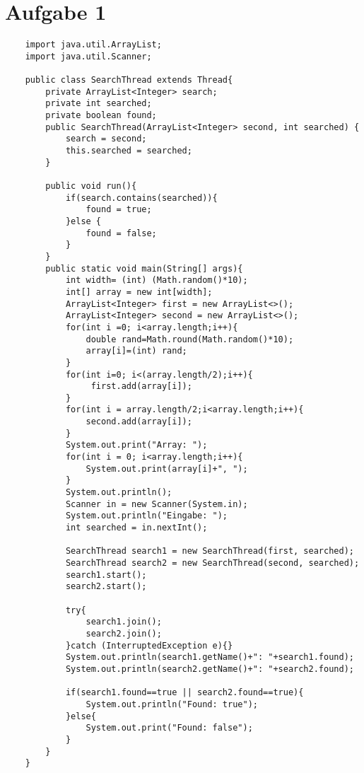 \documentclass[12pt,a4paper,oneside,ngerman]{article}
\begin{document}

\section*{Aufgabe 1}
\begin{lstlisting}
    import java.util.ArrayList;
    import java.util.Scanner;
    
    public class SearchThread extends Thread{
        private ArrayList<Integer> search;
        private int searched;
        private boolean found;
        public SearchThread(ArrayList<Integer> second, int searched) {
            search = second;
            this.searched = searched;
        }
    
        public void run(){
            if(search.contains(searched)){
                found = true;
            }else {
                found = false;
            }
        }
        public static void main(String[] args){
            int width= (int) (Math.random()*10);
            int[] array = new int[width];
            ArrayList<Integer> first = new ArrayList<>();
            ArrayList<Integer> second = new ArrayList<>();
            for(int i =0; i<array.length;i++){
                double rand=Math.round(Math.random()*10);
                array[i]=(int) rand;
            }
            for(int i=0; i<(array.length/2);i++){
                 first.add(array[i]);
            }
            for(int i = array.length/2;i<array.length;i++){
                second.add(array[i]);
            }
            System.out.print("Array: ");
            for(int i = 0; i<array.length;i++){
                System.out.print(array[i]+", ");
            }
            System.out.println();
            Scanner in = new Scanner(System.in);
            System.out.println("Eingabe: ");
            int searched = in.nextInt();
            
            SearchThread search1 = new SearchThread(first, searched);
            SearchThread search2 = new SearchThread(second, searched);
            search1.start();
            search2.start();
    
            try{
                search1.join();
                search2.join();
            }catch (InterruptedException e){}
            System.out.println(search1.getName()+": "+search1.found);
            System.out.println(search2.getName()+": "+search2.found);
    
            if(search1.found==true || search2.found==true){
                System.out.println("Found: true");
            }else{
                System.out.print("Found: false");
            }
        }
    }
    
\end{lstlisting}
\end{document}
